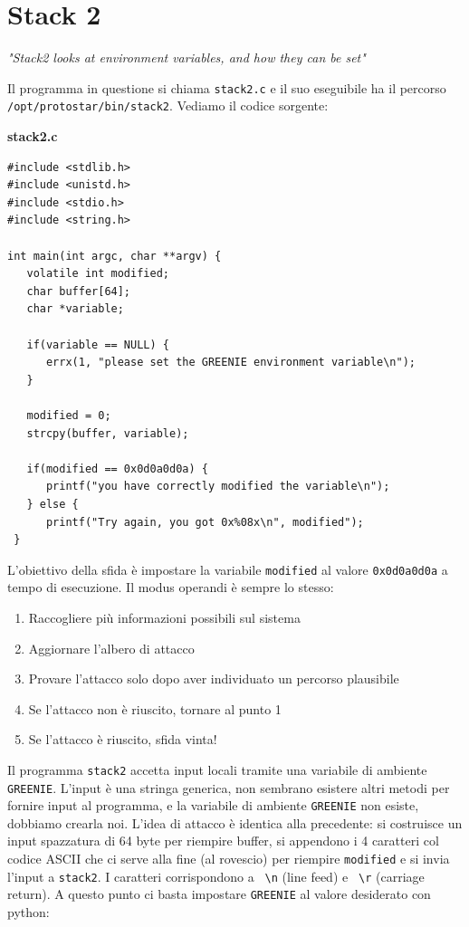 \section{Stack 2}
\begin{center}
    \textit{"Stack2 looks at environment variables, and
how they can be set"}
\end{center}
Il programma in questione si chiama \texttt{stack2.c} e il suo eseguibile ha il percorso \texttt{/opt/protostar/bin/stack2}. Vediamo il codice sorgente:
\begin{mdframed}[backgroundcolor=white!20,shadow=false]
\textbf{stack2.c}
\begin{verbatim}
#include <stdlib.h>
#include <unistd.h>
#include <stdio.h>
#include <string.h>

int main(int argc, char **argv) {
   volatile int modified;
   char buffer[64];
   char *variable;
 
   if(variable == NULL) {
      errx(1, "please set the GREENIE environment variable\n");
   }
 
   modified = 0;
   strcpy(buffer, variable);
 
   if(modified == 0x0d0a0d0a) {
      printf("you have correctly modified the variable\n");
   } else {
      printf("Try again, you got 0x%08x\n", modified");
 } 
\end{verbatim}
\end{mdframed}
L'obiettivo della sfida è impostare la variabile \texttt{modified} al valore \texttt{0x0d0a0d0a} a tempo di esecuzione. Il modus operandi è sempre lo stesso:
\begin{enumerate}
    \item Raccogliere più informazioni possibili sul sistema
    \item Aggiornare l'albero di attacco
    \item Provare l'attacco solo dopo aver individuato un
percorso plausibile
    \item Se l'attacco non è riuscito, tornare al punto 1
    \item Se l'attacco è riuscito, sfida vinta! 
\end{enumerate}
Il programma \texttt{stack2} accetta input locali tramite una variabile di ambiente \texttt{GREENIE}. L'input è una stringa generica, non sembrano esistere altri metodi per fornire input al programma, e la variabile di ambiente \texttt{GREENIE} non esiste, dobbiamo crearla noi. L'idea di attacco è identica alla precedente: si costruisce un input spazzatura di 64 byte per riempire buffer, si appendono i 4 caratteri col codice ASCII che ci serve alla fine (al rovescio) per riempire \texttt{modified} e si invia l'input a \texttt{stack2}. I caratteri corrispondono a \texttt{ \textbackslash n} (line feed) e \texttt{ \textbackslash r} (carriage return). A questo punto ci basta impostare \texttt{GREENIE} al valore desiderato con python:
